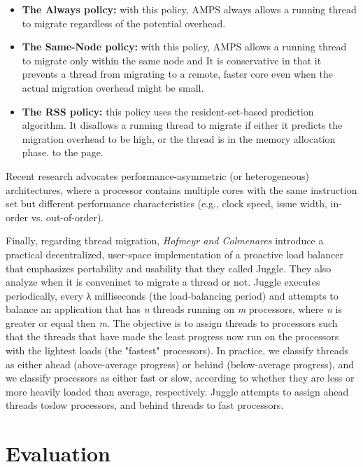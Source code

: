 \documentclass[a4paper,10pt]{article}
\begin{document}
\begin{multicols}{2}
\begin{itemize}
    \item \textbf{The Always policy:} with this policy, AMPS always allows a running thread to migrate regardless of the potential overhead.
    \item \textbf{The Same-Node policy:} with this policy, AMPS allows a running thread to migrate only within the same node and It is conservative in that it prevents a thread from migrating to a remote, faster core even when the actual migration overhead might be small.
   \item \textbf{The RSS policy:} this policy uses the resident-set-based prediction algorithm. It disallows a running thread to migrate if either it predicts the migration overhead to be high, or the thread is in the memory allocation phase.
to the page.
\end{itemize}

Recent research \cite{Balakrishnan05theimpact} advocates performance-asymmetric (or heterogeneous) architectures, where a processor contains multiple cores with the same instruction set but different performance characteristics (e.g., clock speed, issue width, in-order vs. out-of-order).\par
\parindent 10mm Finally, regarding thread migration, \emph{Hofmeyr and Colmenares} \cite{juggle} introduce a practical decentralized, user-space implementation of a proactive load balancer that emphasizes portability and usability that they called Juggle. They also analyze when it is conveninet to migrate a thread or not. Juggle executes periodically, every λ milliseconds (the load-balancing period) and attempts to balance an application that has \emph{n} threads running on \emph{m} processors, where \emph{n} is greater or equal then \emph{m}. The objective is to assign threads to processors such that the threads that have made the least progress now run on the processors with the lightest loads (the "fastest" processors). In practice, we classify threads as either ahead (above-average progress) or behind (below-average progress), and we classify processors as either fast or slow, according to whether they are less or more heavily loaded than average, respectively.  Juggle attempts to assign ahead threads toslow processors, and behind threads to fast processors.

\section{Evaluation}


\end{multicols}
\end{document}
